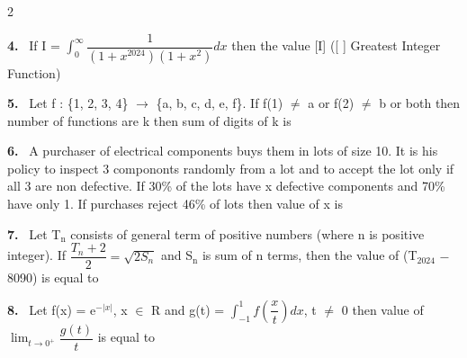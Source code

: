 \documentclass[10pt]{extarticle}
\newcommand{\qn}[1]{\par\smallskip\noindent\textbf{#1.}~}
\begin{document}
\begin{multicols}{2}
\qn{4} If I = $\displaystyle\int_0^\infty\dfrac1{\left(1+x^{2024}\right)\left(1+x^2\right)}dx$ then the value [I] ([ ] Greatest Integer Function)
\qn{5} Let f : \{1, 2, 3, 4\} $\to$ \{a, b, c, d, e, f\}. If f(1) $\neq$ a or f(2) $\neq$ b or both then number of functions are k then sum of digits of k is
\qn{6} A purchaser of electrical components buys them in lots of size 10. It is his policy to inspect 3 compononts randomly from a lot and to accept the lot only if all 3 are non defective. If 30\% of the lots have x defective components and 70\% have only 1. If purchases reject 46\% of lots then value of x is
\qn{7} Let T$_\mathrm n$ consists of general term of positive numbers (where n is positive integer). If $\dfrac{T_n+2}2=\sqrt{2S_n}$ and S$_\mathrm n$ is sum of n terms, then the value of (T$_{2024}$ $-$ 8090) is equal to
\qn{8} Let f(x) = e$^{-|x|}$, x $\in$ R and g(t) = $\displaystyle\int_{-1}^{1}f\left(\dfrac xt\right)dx$, t $\neq$ 0 then value of $\displaystyle\lim_{t\to0^+}\dfrac{g(t)}t$ is equal to
\end{multicols}
\end{document}
